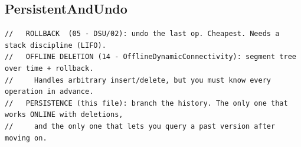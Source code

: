 \documentclass[9pt,a4paper,twocolumn]{extarticle}
\begin{document}
\filbreak
\subsection{PersistentAndUndo}
\nopagebreak
\begin{lstlisting}
//   ROLLBACK  (05 - DSU/02): undo the last op. Cheapest. Needs a stack discipline (LIFO).
//   OFFLINE DELETION (14 - OfflineDynamicConnectivity): segment tree over time + rollback.
//     Handles arbitrary insert/delete, but you must know every operation in advance.
//   PERSISTENCE (this file): branch the history. The only one that works ONLINE with deletions,
//     and the only one that lets you query a past version after moving on.


\end{lstlisting}
\end{document}
